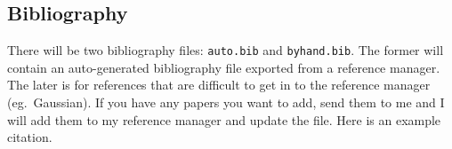\subsection{Bibliography}
There will be two bibliography files: \texttt{auto.bib} and \texttt{byhand.bib}.
The former will contain an auto-generated bibliography file exported from a reference manager.
The later is for references that are difficult to get in to the reference manager (eg.~Gaussian).
If you have any papers you want to add, send them to me and I will add them to my reference manager and update the file.
Here is an example citation\cite{jacak_computational_2012}.
